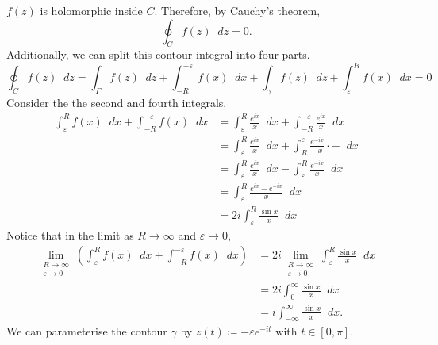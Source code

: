 \documentclass[a4paper]{article}
\newcommand*\diff{\mathop{}\!d} %
\theoremstyle{definition}
\begin{document}
$f(z)$ is holomorphic inside $C$.
Therefore, by Cauchy's theorem,
\begin{equation*}
    \oint_{C} f(z) \diff z = 0.
\end{equation*}
Additionally, we can split this contour integral into four parts.
\begin{equation*}
    \oint_{C} f(z) \diff z = \int_{\Gamma} f(z) \diff z + \int_{-R}^{-\varepsilon} f(x) \diff x + \int_{\gamma} f(z) \diff z + \int_{\varepsilon}^{R} f(x) \diff x = 0
\end{equation*}
Consider the the second and fourth integrals.
\begin{align*}
    \int_{\varepsilon}^{R} f(x) \diff x + \int_{-R}^{-\varepsilon} f(x) \diff x & = \int_{\varepsilon}^{R} \frac{e^{ix}}{x} \diff x + \int_{-R}^{-\varepsilon} \frac{e^{ix}}{x} \diff x         \\
                                                                                & = \int_{\varepsilon}^{R} \frac{e^{ix}}{x} \diff x + \int_{R}^{\varepsilon} \frac{e^{-ix}}{-x} \cdot - \diff x \\
                                                                                & = \int_{\varepsilon}^{R} \frac{e^{ix}}{x} \diff x - \int_{\varepsilon}^{R} \frac{e^{-ix}}{x} \diff x          \\
                                                                                & = \int_{\varepsilon}^{R} \frac{e^{ix} - e^{-ix}}{x} \diff x                                                   \\
                                                                                & = 2i \int_{\varepsilon}^{R} \frac{ \sin x}{x} \diff x
\end{align*}
Notice that in the limit as $R \to \infty$ and $\varepsilon \to 0$,
\begin{align*}
    \lim_{\substack{R \to \infty                             \\ \varepsilon \to 0}} \left( \int_{\varepsilon}^{R} f(x) \diff x + \int_{-R}^{-\varepsilon} f(x) \diff x \right)  &= 2i \lim_{\substack{R \to \infty \\ \varepsilon \to 0}} \int_{\varepsilon}^{R} \frac{\sin x}{x} \diff x \\
     & = 2i \int_{0}^{\infty} \frac{\sin x}{x} \diff x       \\
     & = i \int_{-\infty}^{\infty} \frac{\sin x}{x} \diff x.
\end{align*}
We can parameterise the contour $\gamma$ by $z(t) \coloneq -\varepsilon e^{-it}$ with $t \in [0, \pi]$.
\end{document}
